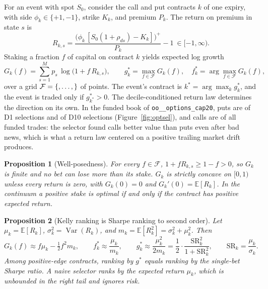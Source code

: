\documentclass[11pt]{article}
\makeatletter
\newtheorem{proposition}{Proposition}
\theoremstyle{definition}
\newcommand{\E}{\mathbb{E}}
\newcommand{\Var}{\operatorname{Var}}
\newcommand{\1}{\mathbf{1}}
\newcommand{\F}{\mathcal{F}}
\newcommand{\sn}[1]{\texttt{\sn@scan#1\@nil}}
\def\sn@scan#1{\ifx#1\@nil\else\ifx#1_\_\allowbreak\else#1\fi\expandafter\sn@scan\fi}
\makeatother
\begin{document}
For an event with spot $S_0$, consider the call and put contracts $k$ of one expiry, with side $\phi_k\in\{+1,-1\}$, strike $K_k$, and premium $P_k$. The return on premium in state $s$ is
\begin{equation}
  R_{k,s}=\frac{\big(\phi_k\,[S_0(1+\rho_{ds})-K_k]\big)^+}{P_k}-1\ \in[-1,\infty).
  \label{eq:payoff}
\end{equation}
Staking a fraction $f$ of capital on contract $k$ yields expected log growth
\begin{equation}
  G_k(f)=\sum_{s=1}^{M}p_s\,\log\big(1+f\,R_{k,s}\big),\qquad
  g^\ast_k=\max_{f\in\F}G_k(f),\quad f^\ast_k=\arg\max_{f\in\F}G_k(f),
  \label{eq:growth}
\end{equation}
over a grid $\F=\{\stv{kelly.fmin},\dots,\stv{kelly.fmax}\}$ of  points. The event's contract is $k^\ast=\arg\max_k g^\ast_k$, and the event is traded only if $g^\ast_{k^\ast}>0$. The decile-conditioned
return law determines the direction on its own. In the funded book of \sn{options_cap20}, puts are  of D1 selections and  of D10 selections (Figure~\ref{fig:optsel}), and calls are 
of all funded trades: the selector found calls better value than puts even after bad news, which is what a return law centered on a positive trailing market drift produces.

\begin{proposition}[Well-posedness]\label{prop:wellposed}
For every $f\in\F$, $1+fR_{k,s}\ge 1-f>0$, so $G_k$ is finite and no bet can lose more than its stake. $G_k$ is strictly concave on $[0,1)$ unless every return is zero, with $G_k(0)=0$ and $G_k'(0)=\E[R_k]$.
In the continuum a positive stake is optimal if and only if the contract has positive expected return.
\end{proposition}

\begin{proposition}[Kelly ranking is Sharpe ranking to second order]\label{prop:sharpe}
Let $\mu_k=\E[R_k]$, $\sigma_k^2=\Var(R_k)$, and $m_k=\E[R_k^2]=\sigma_k^2+\mu_k^2$. Then
\begin{equation}
  G_k(f)\approx f\mu_k-\tfrac12 f^2 m_k,\qquad
  f^\ast_k\approx\frac{\mu_k}{m_k},\qquad
  g^\ast_k\approx\frac{\mu_k^2}{2m_k}=\frac12\cdot\frac{\mathrm{SR}_k^2}{1+\mathrm{SR}_k^2},
  \qquad \mathrm{SR}_k=\frac{\mu_k}{\sigma_k}.
\end{equation}
Among positive-edge contracts, ranking by $g^\ast$ equals ranking by the single-bet Sharpe ratio. A naive selector ranks by the expected return $\mu_k$, which is unbounded in the right tail and ignores risk.
\end{proposition}
\end{document}
